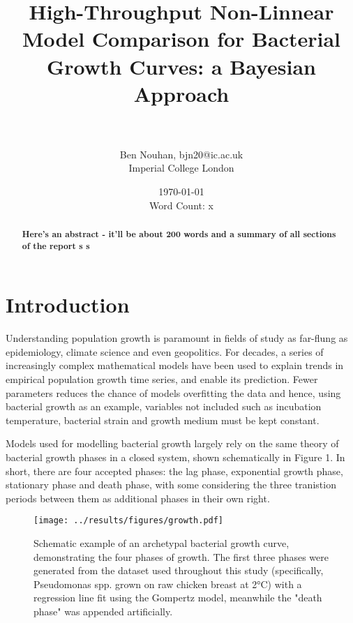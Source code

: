\documentclass[11pt]{article}
\title{High-Throughput Non-Linnear Model Comparison for Bacterial Growth Curves: a Bayesian Approach}
\author{\\ \\ Ben Nouhan, bjn20@ic.ac.uk \\ Imperial College London \\}
\date{\today \\ Word Count: x}
\begin{document}
\maketitle
\thispagestyle{empty}

\vspace{30mm}
\onehalfspacing
\renewcommand{\abstractname}{\vspace{-\baselineskip}} %

\begin{abstract}
    \linenumbers
    \noindent
    \textbf{Here's an abstract - it'll be about 200 words and a summary of all sections of the report s s
    }
\end{abstract}
\vspace{10mm}


\newpage
\tableofcontents
\thispagestyle{empty}

\newpage
\linenumbers
\setcounter{page}{1}
\section{Introduction}%


Understanding population growth is paramount in fields of study as far-flung as epidemiology, climate science and even geopolitics.\parencite{Ozgul2010,Peleg1997} For decades, a series of increasingly complex mathematical models have been used to explain trends in empirical population growth time series, and enable its prediction.\parencite{Kingsland1982,Grijspeerdt1999,Tjørve2017} Fewer parameters reduces the chance of models overfitting the data and hence, using bacterial growth as an example, variables not included such as incubation temperature, bacterial strain and growth medium must be kept constant.

Models used for modelling bacterial growth largely rely on the same theory of bacterial growth phases in a closed system, shown schematically in Figure 1. In short, there are four accepted phases: the lag phase, exponential growth phase, stationary phase and death phase, with some considering the three tranistion periods between them as additional phases in their own right.\parencite{Buchanan1918}

\vspace{5mm}
\begin{figure}[htb]
    \centering
    \texttt{[image: ../results/figures/growth.pdf]}
    \caption{Schematic example of an archetypal bacterial growth curve, demonstrating the four phases of growth. The first three phases were generated from the dataset used throughout this study (specifically, Pseudomonas spp. grown on raw chicken breast at 2°C) with a regression line fit using the Gompertz model, meanwhile the "death phase" was appended artificially.}
\end{figure}
\vspace{5mm}
\end{document}

